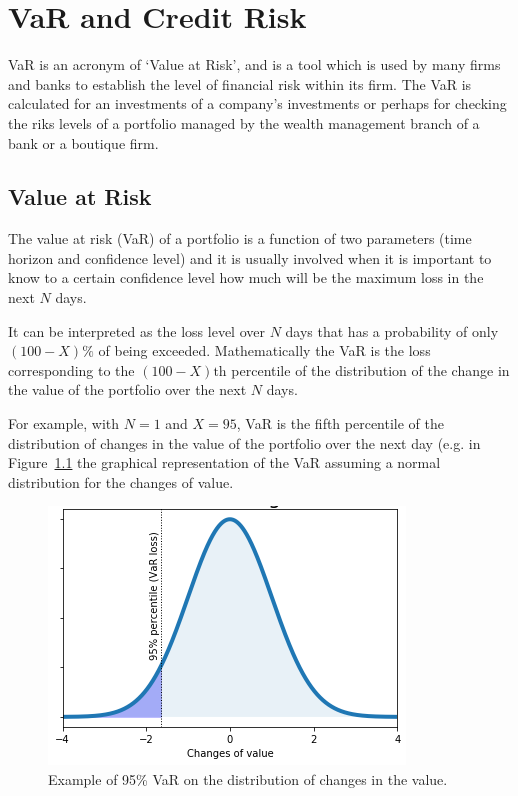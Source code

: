\chapter{VaR and Credit Risk}\label{var-and-credit-risk}

VaR is an acronym of ‘Value at Risk’, and is a tool which is used by many firms and banks to establish the level of financial risk within its firm. The VaR is calculated for an investments of a company’s investments or perhaps for checking the riks levels of a portfolio managed by the wealth management branch of a bank or a boutique firm.

\section{Value at Risk}\label{value-at-risk}

The value at risk (VaR) of a portfolio is a function of two parameters
(time horizon and confidence level) and it is usually involved when it
is important to know to a certain confidence level how
much will be the maximum loss in the next $N$ days. 

It can be interpreted as the loss level over \(N\) days that has a 
probability of only \((100 - X)\%\) of being exceeded.
Mathematically the VaR is the loss corresponding to the
\((100-X)\textrm{th}\) percentile of the distribution of the change in
the value of the portfolio over the next \(N\) days. 

For example, with \(N=1\) and \(X=95\), VaR is the fifth percentile of the distribution of
changes in the value of the portfolio over the next day (e.g. in Figure~\ref{fig:var_loss}
the graphical representation of the VaR assuming a normal
distribution for the changes of value.

\begin{figure}
\centering
  \includegraphics[width=0.6\linewidth]{figures/lecture_9_2_0.png}
  \caption{Example of 95\% VaR on the distribution of changes in the value.}
  \label{fig:var_loss}
\end{figure}
    
